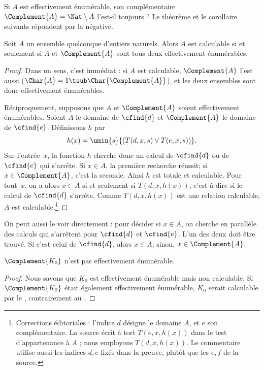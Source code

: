 \documentclass[../../../include/open-logic-section]{subfiles}
\begin{document}

Si $A$ est effectivement énumérable, son complémentaire
$\Complement{A}=\Nat\setminus A$ l'est-il toujours ?
Le théorème et le corollaire suivants répondent
par la négative.

\begin{thm}
Soit $A$ un ensemble quelconque d'entiers naturels.
Alors $A$ est calculable si et seulement si $A$
et $\Complement{A}$ sont tous deux effectivement
énumérables.
\end{thm}

\begin{proof}
Dans un sens, c'est immédiat : si $A$ est calculable,
$\Complement{A}$ l'est aussi
($\Char{A}=1\tsub\Char{\Complement{A}}$), et
les deux ensembles sont donc effectivement
énumérables.

Réciproquement, supposons que $A$ et
$\Complement{A}$ soient effectivement énumérables.
Soient $A$ le domaine de $\cfind{d}$ et
$\Complement{A}$ le domaine de $\cfind{e}$.
Définissons $h$ par
\[
h(x) = \umin{s}{(T(d,x,s) \lor T(e,x,s))}.
\]
Sur l'entrée~$x$, la fonction $h$ cherche donc un
calcul de $\cfind{d}$ ou de $\cfind{e}$ qui
s'arrête. Si $x\in A$, la première recherche
réussit; si $x\in\Complement{A}$, c'est la
seconde. Ainsi $h$ est totale et calculable.
Pour tout~$x$, on a alors $x\in A$ si et seulement
si $T(d,x,h(x))$, c'est-à-dire si le calcul de
$\cfind{d}$ s'arrête. Comme
$T(d,x,h(x))$ est une relation calculable,
$A$ est calculable.\footnote{Corrections éditoriales : l'indice $d$ désigne le domaine $A$, et $e$ son complémentaire. La source écrit à tort $T(e,x,h(x))$ dans le test d'appartenance à $A$ ; nous employons $T(d,x,h(x))$. Le commentaire utilise aussi les indices $d,e$ fixés dans la preuve, plutôt que les $e,f$ de la source.}
\end{proof}

\begin{explain}
On peut aussi le voir directement : pour décider
si $x\in A$, on cherche en parallèle des calculs
qui s'arrêtent pour $\cfind{d}$ et $\cfind{e}$.
L'un des deux doit être trouvé. Si c'est celui
de $\cfind{d}$, alors $x\in A$; sinon,
$x\in\Complement{A}$.
\end{explain}

\begin{cor}
$\Complement{K_0}$ n'est pas effectivement
énumérable.
\end{cor}

\begin{proof}
Nous savons que $K_0$ est effectivement énumérable
mais non calculable. Si $\Complement{K_0}$ était
également effectivement énumérable, $K_0$ serait
calculable par le , contrairement
au .
\end{proof}
\end{document}
